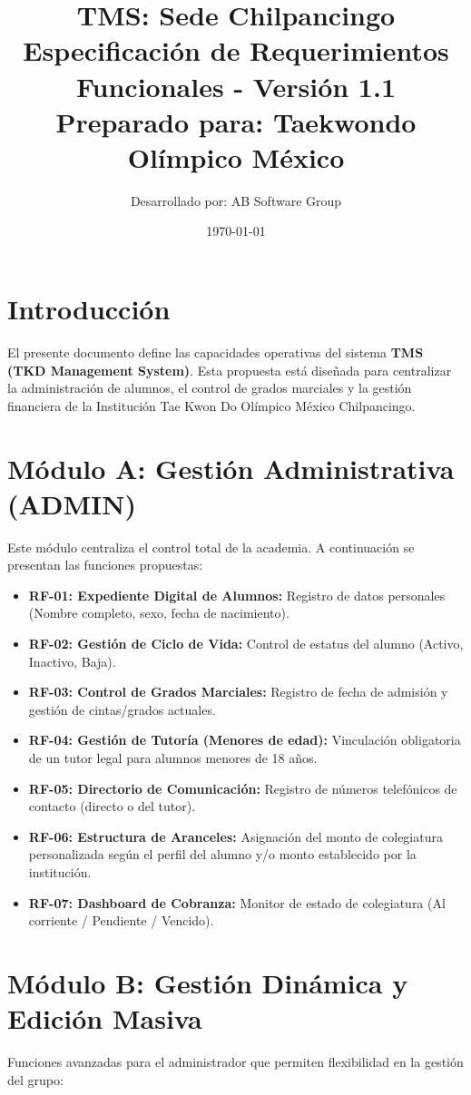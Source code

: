 \documentclass[12pt,a4paper]{article}
\title{
	\textbf{\Huge TMS: Sede Chilpancingo}\\
	\large Especificación de Requerimientos Funcionales - Versión 1.1\\
	\vspace{0.5cm}
	\small Preparado para: Taekwondo Olímpico México
}
\author{Desarrollado por: AB Software Group}
\date{\today}
\begin{document}
	
	\maketitle
	
	\section{Introducción}
	El presente documento define las capacidades operativas del sistema \textbf{TMS (TKD Management System)}. Esta propuesta está diseñada para centralizar la administración de alumnos, el control de grados marciales y la gestión financiera de la Institución Tae Kwon Do Olímpico México Chilpancingo.
	
	\section{Módulo A: Gestión Administrativa (ADMIN)}
	Este módulo centraliza el control total de la academia. A continuación se presentan las funciones propuestas:
	
	\begin{itemize}[label=$\square$]
		\item \textbf{RF-01: Expediente Digital de Alumnos:} Registro de datos personales (Nombre completo, sexo, fecha de nacimiento).
		\item \textbf{RF-02: Gestión de Ciclo de Vida:} Control de estatus del alumno (Activo, Inactivo, Baja).
		\item \textbf{RF-03: Control de Grados Marciales:} Registro de fecha de admisión y gestión de cintas/grados actuales.
		\item \textbf{RF-04: Gestión de Tutoría (Menores de edad):} Vinculación obligatoria de un tutor legal para alumnos menores de 18 años.
		\item \textbf{RF-05: Directorio de Comunicación:} Registro de números telefónicos de contacto (directo o del tutor).
		\item \textbf{RF-06: Estructura de Aranceles:} Asignación del monto de colegiatura personalizada según el perfil del alumno y/o monto establecido por la institución.
		\item \textbf{RF-07: Dashboard de Cobranza:} Monitor de estado de colegiatura (Al corriente / Pendiente / Vencido).
	\end{itemize}
	
	\section{Módulo B: Gestión Dinámica y Edición Masiva}
	Funciones avanzadas para el administrador que permiten flexibilidad en la gestión del grupo:
	
\end{document}

